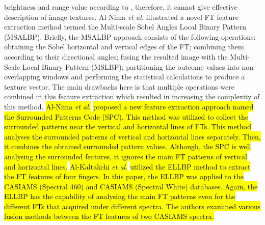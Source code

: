 \documentclass[review]{elsarticle}
\begin{document}
brightness and range value according to \cite{young1998fundamentals}, therefore, it cannot give effective description of image textures. Al-Nima \textit{et al.} \cite{Al-Nima2017finger} illustrated a novel FT feature extraction method termed the Multi-scale Sobel Angles Local Binary Pattern (MSALBP). Briefly, the MSALBP approach consists of the following operations: obtaining the Sobel horizontal and vertical edges of the FT; combining them according to their directional angles; fusing the resulted image with the Multi-Scale Local Binary Pattern (MSLBP); partitioning the outcome values into non-overlapping windows and performing the statistical calculations to produce a texture vector. The main drawbacks here is that multiple operations were combined in this feature extraction which resulted in increasing the complexity of this method. \hl{Al-Nima \textit{et al.}} \cite{al2018personal} \hl{proposed a new feature extraction approach named the Surrounded Patterns Code (SPC). This method was utilized to collect the	surrounded patterns near the vertical and horizontal lines of FTs. This method analyses the surrounded patterns of vertical and horizontal lines separately. Then, it combines the obtained surrounded pattern values. Although, the SPC is well analysing the surrounded features, it ignores the main FT patterns of vertical and horizontal lines.} \hl{Al-Kaltakchi \textit{et al.}} \cite{al2018finger} \hl{utilized the ELLBP method to extract the FT features of four fingers. In this paper, the ELLBP was applied to the CASIAMS (Spectral 460) and CASIAMS (Spectral White) databases. Again, the ELLBP has the capability of analysing the main FT patterns even for the different FTs that acquired under different spectra. The authors examined various fusion methods between the FT features of two CASIAMS spectra.}
	
\end{document}
